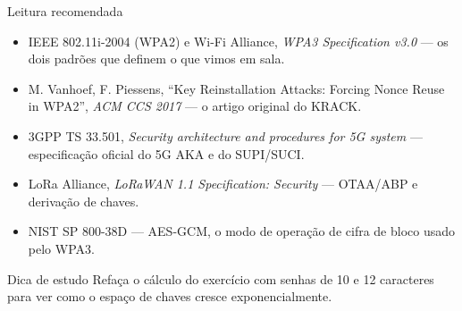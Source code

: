 \documentclass[aspectratio=169,11pt]{beamer}
\begin{document}
\begin{frame}{Leitura recomendada}
  \begin{itemize}
    \item IEEE 802.11i-2004 (WPA2) e Wi-Fi Alliance, \emph{WPA3 Specification v3.0} --- os dois padrões que definem o que vimos em sala.
    \item M. Vanhoef, F. Piessens, ``Key Reinstallation Attacks: Forcing Nonce Reuse in WPA2'', \emph{ACM CCS 2017} --- o artigo original do KRACK.
    \item 3GPP TS 33.501, \emph{Security architecture and procedures for 5G system} --- especificação oficial do 5G AKA e do SUPI/SUCI.
    \item LoRa Alliance, \emph{LoRaWAN 1.1 Specification: Security} --- OTAA/ABP e derivação de chaves.
    \item NIST SP 800-38D --- AES-GCM, o modo de operação de cifra de bloco usado pelo WPA3.
  \end{itemize}
  \begin{alertblock}{Dica de estudo}
    Refaça o cálculo do exercício com senhas de 10 e 12 caracteres para ver como o espaço de chaves cresce exponencialmente.
  \end{alertblock}
\end{frame}
\end{document}
